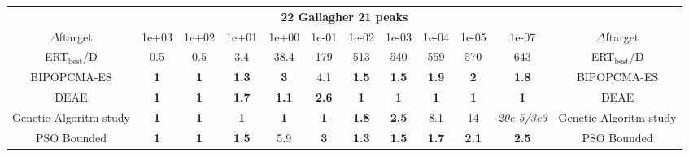 \begin{tabular}{cccccccccccc}
 & \multicolumn{10}{c}{{\normalsize \textbf{22 Gallagher 21 peaks}}}\\
$\Delta$ftarget& 1e+03& 1e+02& 1e+01& 1e+00& 1e-01& 1e-02& 1e-03& 1e-04& 1e-05& 1e-07 & $\Delta$ftarget \\
ERT$_{\textrm{best}}$/D& 0.5& 0.5& 3.4& 38.4& 179& 513& 540& 559& 570& 643 & ERT$_{\textrm{best}}$/D \\
\hline
BIPOPCMA-ES & \textbf{1} & \textbf{1} & \textbf{1.3} & \textbf{3} & 4.1 & \textbf{1.5} & \textbf{1.5} & \textbf{1.9} & \textbf{2} & \textbf{1.8} & BIPOPCMA-ES \cite{add_an_entry_for_BIPOPCMA-ES_in_bbob.bib}\\
DEAE & \textbf{1} & \textbf{1} & \textbf{1.7} & \textbf{1.1} & \textbf{2.6} & \textbf{1} & \textbf{1} & \textbf{1} & \textbf{1} & \textbf{1} & DEAE \cite{add_an_entry_for_DEAE_in_bbob.bib}\\
Genetic Algoritm study & \textbf{1} & \textbf{1} & \textbf{1} & \textbf{1} & \textbf{1} & \textbf{1.8} & \textbf{2.5} & 8.1 & 14 & \textit{20e-5}\textit{/3e3} & Genetic Algoritm study \cite{add_an_entry_for_Genetic Algoritm study_in_bbob.bib}\\
PSO Bounded & \textbf{1} & \textbf{1} & \textbf{1.5} & 5.9 & \textbf{3} & \textbf{1.3} & \textbf{1.5} & \textbf{1.7} & \textbf{2.1} & \textbf{2.5} & PSO Bounded \cite{add_an_entry_for_PSO Bounded_in_bbob.bib}
\end{tabular}
